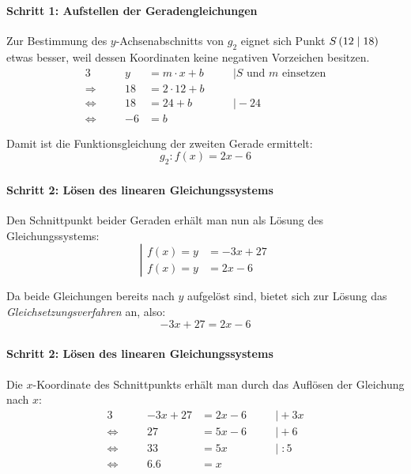 \documentclass
[
  fontsize = 10pt,
  compress = true,
  ngerman,
  dvipsnames
]
{beamer}
\begin{document}
\begin{frame}
  \frametitle{\sectiontitle}
  \framesubtitle{Schritt 1: Aufstellen der Geradengleichungen}
  Zur Bestimmung des $y$-Achsenabschnitts von $g_2$ eignet sich
  Punkt $S\left(\num{12}\;\middle|\;\num{18}\right)$ etwas besser, weil dessen Koordinaten keine
  negativen Vorzeichen besitzen.
  \begin{alignat*}{3}
                   &\quad &  y&=m\cdot x+b  & \quad&\mid\text{$S$ und $m$ einsetzen} \\
    \Rightarrow    &\quad & 18&=2\cdot 12+b & \quad&        \\
    \Leftrightarrow&\quad & 18&=24+b        & \quad&\mid-24 \\
    \Leftrightarrow&\quad & -6&=b           & \quad&
  \end{alignat*}

  \pause

  Damit ist die Funktionsgleichung der zweiten Gerade ermittelt:
  \begin{equation*}
    g_2:f(x)=2x-6
  \end{equation*}
\end{frame}

\begin{frame}
  \frametitle{\sectiontitle}
  \framesubtitle{Schritt 2: Lösen des linearen Gleichungssystems}
  Den Schnittpunkt beider Geraden erhält man nun als Lösung des
  Gleichungssystems:
  \begin{equation*}
    \left|
    \begin{aligned}
      f(x)=y&=-3x+27 \\
      f(x)=y&=2x-6
    \end{aligned}
    \right.
  \end{equation*}

  \pause

  Da beide Gleichungen bereits nach $y$ aufgelöst sind, bietet
  sich zur Lösung das \emph{Gleichsetzungsverfahren} an, also:
  \begin{equation*}
    -3x+27=2x-6
  \end{equation*}
\end{frame}

\begin{frame}
  \frametitle{\sectiontitle}
  \framesubtitle{Schritt 2: Lösen des linearen Gleichungssystems}
  Die $x$-Koordinate des Schnittpunkts erhält man durch das
  Auflösen der Gleichung nach $x$:
  \begin{alignat*}{3}
                   &\quad &      -3x+27&=2x-6 & \quad&\mid+3x  \\
    \Leftrightarrow&\quad &          27&=5x-6 & \quad&\mid+6   \\
    \Leftrightarrow&\quad &        33&=5x     & \quad&\mid\;:5 \\
    \Leftrightarrow&\quad & \num{6.6}&=x      & \quad&
  \end{alignat*}
\end{frame}
\end{document}
